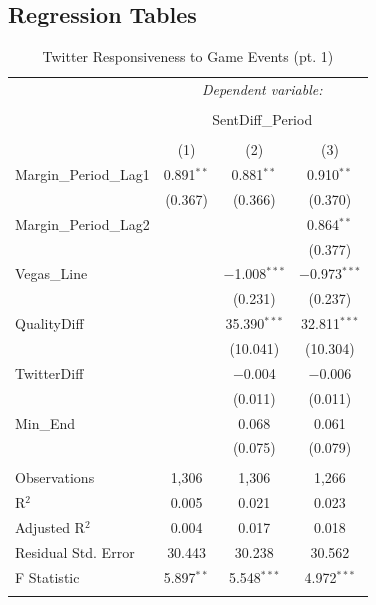\documentclass[12pt]{article}
\begin{document}
\begin{doublespacing}
\section*{Regression Tables}

\begin{table}[H] 
\centering 
\caption{Twitter Responsiveness to Game Events (pt. 1)} 
\label{} 
\begin{tabular*}{\textwidth}{@{\extracolsep{\fill}}lccc} 
\hline 
\hline
 & \multicolumn{3}{c}{\textit{Dependent variable:}} \\ 
\cline{2-4} 
\\[-3.0ex] & \multicolumn{3}{c}{SentDiff\_Period} \\ 
\\[-1.5ex] & (1) & (2) & (3)\\ 
\hline
 Margin\_Period\_Lag1 & 0.891$^{**}$ & 0.881$^{**}$ & 0.910$^{**}$ \\ 
  & (0.367) & (0.366) & (0.370) \\ 
 Margin\_Period\_Lag2 &  &  & 0.864$^{**}$ \\ 
  &  &  & (0.377) \\ 
 Vegas\_Line &  & $-$1.008$^{***}$ & $-$0.973$^{***}$ \\ 
  &  & (0.231) & (0.237) \\ 
 QualityDiff &  & 35.390$^{***}$ & 32.811$^{***}$ \\ 
  &  & (10.041) & (10.304) \\ 
 TwitterDiff &  & $-$0.004 & $-$0.006 \\ 
  &  & (0.011) & (0.011) \\ 
 Min\_End &  & 0.068 & 0.061 \\ 
  &  & (0.075) & (0.079) \\ 
\hline \\[-1.8ex] 
Observations & 1,306 & 1,306 & 1,266 \\ 
R$^{2}$ & 0.005 & 0.021 & 0.023 \\ 
Adjusted R$^{2}$ & 0.004 & 0.017 & 0.018 \\ 
Residual Std. Error & 30.443 & 30.238 & 30.562 \\ 
F Statistic & 5.897$^{**}$ & 5.548$^{***}$ & 4.972$^{***}$ \\ 
\hline 
\hline \\[-1.8ex] 
\end{tabular*} 
\end{table} 


\end{doublespacing}
\end{document}
